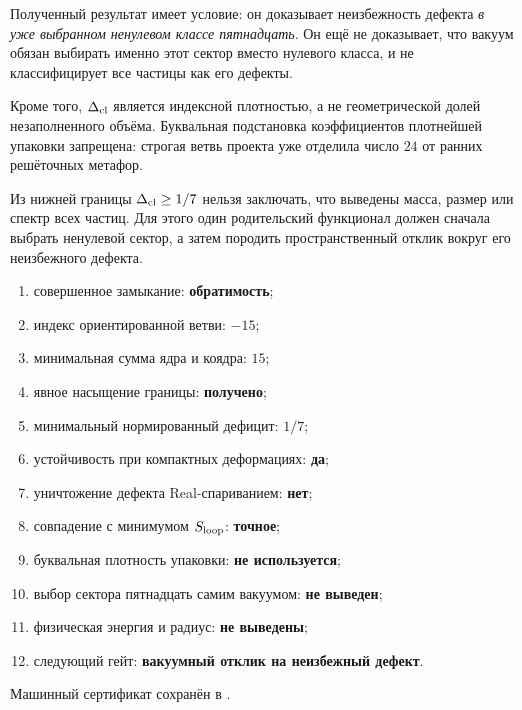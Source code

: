 Полученный результат имеет условие: он доказывает неизбежность дефекта
\emph{в уже выбранном ненулевом классе пятнадцать}. Он ещё не доказывает,
что вакуум обязан выбирать именно этот сектор вместо нулевого класса, и
не классифицирует все частицы как его дефекты.

Кроме того, $\Delta_{\rm cl}$ является индексной плотностью, а не
геометрической долей незаполненного объёма. Буквальная подстановка
коэффициентов плотнейшей упаковки запрещена: строгая ветвь проекта уже
отделила число $24$ от ранних решёточных метафор.

\begin{nogocriterion}
Из нижней границы $\Delta_{\rm cl}\geq1/7$ нельзя заключать, что выведены
масса, размер или спектр всех частиц. Для этого один родительский
функционал должен сначала выбрать ненулевой сектор, а затем породить
пространственный отклик вокруг его неизбежного дефекта.
\end{nogocriterion}

\begin{protocol}
\begin{enumerate}
 \item совершенное замыкание: \textbf{обратимость};
 \item индекс ориентированной ветви: \textbf{$-15$};
 \item минимальная сумма ядра и коядра: \textbf{$15$};
 \item явное насыщение границы: \textbf{получено};
 \item минимальный нормированный дефицит: \textbf{$1/7$};
 \item устойчивость при компактных деформациях: \textbf{да};
 \item уничтожение дефекта Real-спариванием: \textbf{нет};
 \item совпадение с минимумом $S_{\rm loop}$: \textbf{точное};
 \item буквальная плотность упаковки: \textbf{не используется};
 \item выбор сектора пятнадцать самим вакуумом: \textbf{не выведен};
 \item физическая энергия и радиус: \textbf{не выведены};
 \item следующий гейт: \textbf{вакуумный отклик на неизбежный дефект}.
\end{enumerate}
\end{protocol}

Машинный сертификат сохранён в
.
